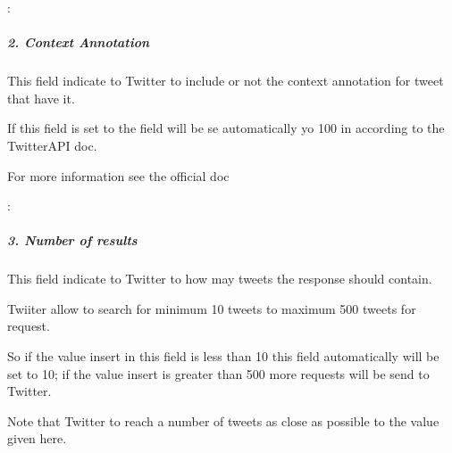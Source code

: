 \documentclass[letterpaper,10pt,english]{sphinxmanual}
\begin{document}
\begin{DUlineblock}{0em}
\item[] : 
\end{DUlineblock}


\subparagraph{2. Context Annotation}
\label{\detokenize{guide/tweet_search_guide:context-annotation}}
\begin{sphinxVerbatim}[commandchars=\\\{\}]
 
\end{sphinxVerbatim}

\begin{DUlineblock}{0em}
\item[] This field indicate to Twitter to include or not the context annotation for tweet that have it.
\item[] If this field is set to  the  field will be se automatically yo 100 in according to the TwitterAPI doc.
\item[] For more information see the official doc 
\end{DUlineblock}

\sphinxAtStartPar
{}: 


\subparagraph{3. Number of results}
\label{\detokenize{guide/tweet_search_guide:number-of-results}}
\begin{sphinxVerbatim}[commandchars=\\\{\}]
 
\end{sphinxVerbatim}

\begin{DUlineblock}{0em}
\item[] This field indicate to Twitter to how may tweets the response should contain.
\item[] Twiiter allow to search for minimum 10 tweets to maximum 500 tweets for request.
\item[] So if the value insert in this field is less than 10 this field automatically will be set to 10; if the value insert is greater than 500 more requests will be send to Twitter.
\item[] Note that Twitter to reach a number of tweets as close as possible to the value given here.
\end{DUlineblock}
\end{document}
